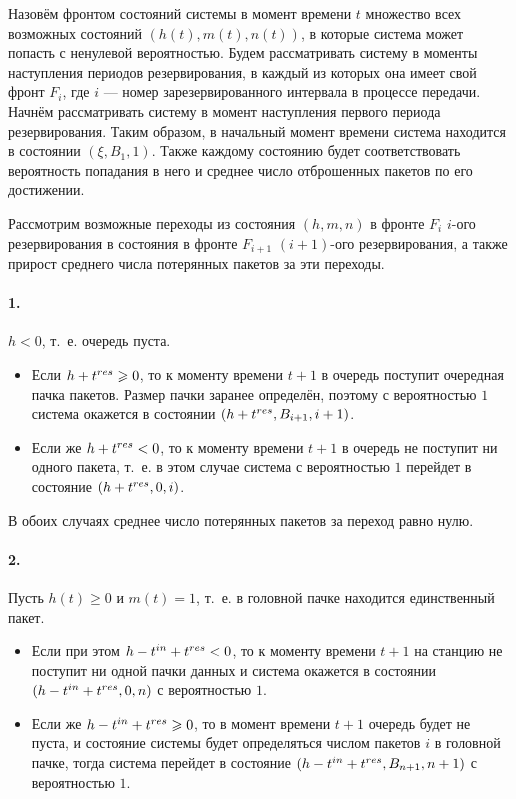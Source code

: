 Назовём фронтом состояний системы в момент времени $t$ множество всех возможных состояний $(h(t), m(t), n(t))$, в которые система может попасть с ненулевой вероятностью. Будем рассматривать систему в моменты наступления периодов резервирования, в каждый из которых она имеет свой фронт $F_i$, где $i$ --- номер зарезервированного интервала в процессе передачи. Начнём рассматривать систему в момент наступления первого периода резервирования. Таким образом, в начальный момент времени система находится в состоянии $(\xi, B_1, 1)$. Также каждому состоянию будет соответствовать вероятность попадания в него и среднее число отброшенных пакетов по его достижении.

Рассмотрим возможные переходы из состояния $(h,m,n)$ в фронте $F_i$ $i$-ого резервирования в состояния в фронте $F_{i + 1}$ $(i+1)$-ого резервирования, а также прирост среднего числа потерянных пакетов за эти переходы.

\paragraph{1.} $h < 0$, т.~е. очередь пуста.

\begin{itemize}
\item Если $h + t^{res} \geqslant 0$, то к моменту времени $t + 1$ в очередь поступит очередная пачка пакетов. Размер пачки заранее определён, поэтому с вероятностью $1$ система окажется в состоянии $(h + t^{res}, B_{i+1}, i+1)$.

\item Если же $h + t^{res} < 0$, то к моменту времени $t + 1$ в очередь не поступит ни одного пакета, т.~е. в этом случае система с вероятностью $1$ перейдет в состояние $(h + t^{res}, 0, i)$. 
\end{itemize}

В обоих случаях среднее число потерянных пакетов за переход равно нулю.
\paragraph{2.} Пусть $h(t) \ge 0$ и $m(t) = 1$, т.~е. в головной пачке находится единственный пакет.

\begin{itemize}
\item Если при этом $h - t^{in} + t^{res} < 0$, то к моменту времени $t + 1$ на станцию не поступит ни одной пачки данных и система окажется в состоянии $(h - t^{in} + t^{res}, 0, n)$ с вероятностью $1$.
\item Если же $h - t^{in} + t^{res} \geqslant 0$, то в момент времени $t + 1$ очередь будет не пуста, и состояние системы будет определяться числом пакетов $i$ в головной пачке, тогда система перейдет в состояние $(h - t^{in} + t^{res}, B_{n+1}, n+1)$ с вероятностью $1$.
\end{itemize}

